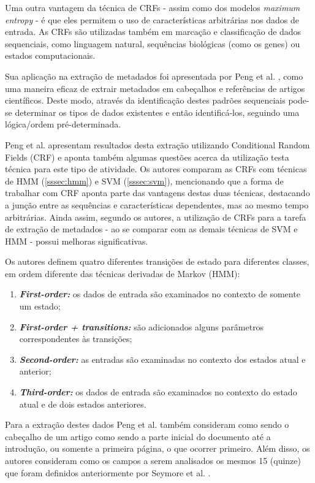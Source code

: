 Uma outra vantagem da técnica de CRFs - assim como dos modelos \emph{maximum entropy} - é que eles permitem o uso de características arbitrárias nos dados de entrada. As CRFs são utilizadas também em marcação e classificação de dados sequenciais, como linguagem natural, sequências biológicas (como os genes) ou estados computacionais.


Sua aplicação na extração de metadados foi apresentada por Peng et al. \cite{Peng-CRF-IE}, como uma maneira eficaz de extrair metadados em cabeçalhos e referências de artigos científicos. Deste modo, através da identificação destes padrões sequenciais pode-se determinar os tipos de dados existentes e então identificá-los, seguindo uma lógica/ordem pré-determinada.

Peng et al. apresentam resultados desta extração utilizando Conditional Random Fields (CRF) e aponta também algumas questões acerca da utilização testa técnica para este tipo de atividade. Os autores comparam as CRFs com técnicas de HMM (\autoref{sssec:hmm}) e SVM (\autoref{sssec:svm}), mencionando que a forma de trabalhar com CRF aponta parte das vantagens destas duas técnicas, destacando a junção entre as sequências e características dependentes, mas ao mesmo tempo arbitrárias. Ainda assim, segundo os autores, a utilização de CRFs para a tarefa de extração de metadados - ao se comparar com as demais técnicas de SVM e HMM - possui melhoras significativas.

Os autores definem quatro diferentes transições de estado para diferentes classes, em ordem diferente das técnicas derivadas de Markov (HMM):

\begin{enumerate}
    \item \emph{\textbf{First-order:}} os dados de entrada são examinados no contexto de somente um estado;
    \item \emph{\textbf{First-order + transitions:}} são adicionados alguns parâmetros correspondentes às transições;
    \item \emph{\textbf{Second-order:}} as entradas são examinadas no contexto dos estados atual e anterior;
    \item \emph{\textbf{Third-order:}} os dados de entrada são examinados no contexto do estado atual e de dois estados anteriores.
\end{enumerate}

Para a extração destes dados Peng et al. também consideram como sendo o cabeçalho de um artigo como sendo a parte inicial do documento até a introdução, ou somente a primeira página, o que ocorrer primeiro. Além disso, os autores consideram como os campos a serem analisados os mesmos 15 (quinze) que foram definidos anteriormente por Seymore et al. \cite{Seymore-HMM-IE}.

